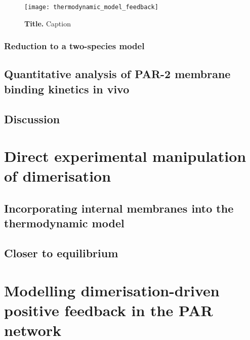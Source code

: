 \documentclass[12pt]{"article"}
\newcommand{\mycaption}[2]{\caption[#1]{\textbf{#1.} #2}}
\begin{document}

\begin{figure}[!h]
\texttt{[image: thermodynamic\_model\_feedback]}
\setlength{\abovecaptionskip}{20pt}
\centering
\mycaption{Title}{Caption}
\end{figure}

\clearpage
\subsubsection{Reduction to a two-species model} 

\clearpage
\subsection{Quantitative analysis of PAR-2 membrane binding kinetics in vivo}


\subsection{Discussion}

\clearpage
\section{Direct experimental manipulation of dimerisation}

\subsection{Incorporating internal membranes into the thermodynamic model}

\subsection{Closer to equilibrium}

\clearpage
\section{Modelling dimerisation-driven positive feedback in the PAR network}
\end{document}
